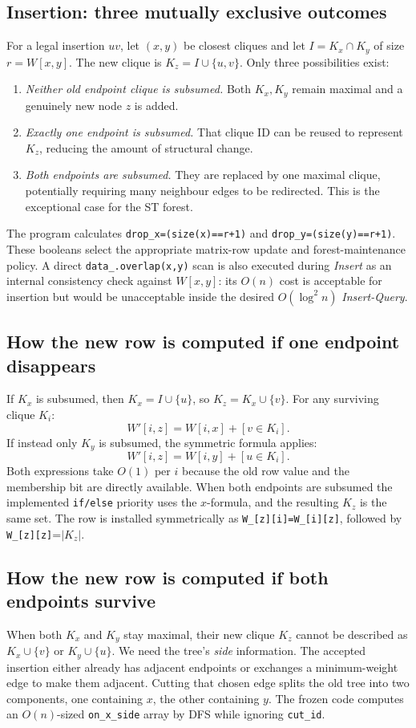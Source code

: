 \subsection{Insertion: three mutually exclusive outcomes}
For a legal insertion \(uv\), let \((x,y)\) be closest cliques and let \(I=K_x\cap K_y\) of size \(r=W[x,y]\).  The new clique is \(K_z=I\cup\{u,v\}\).  Only three possibilities exist:
\begin{enumerate}[leftmargin=*]
\item \emph{Neither old endpoint clique is subsumed.} Both \(K_x,K_y\) remain maximal and a genuinely new node \(z\) is added.
\item \emph{Exactly one endpoint is subsumed.} That clique ID can be reused to represent \(K_z\), reducing the amount of structural change.
\item \emph{Both endpoints are subsumed.} They are replaced by one maximal clique, potentially requiring many neighbour edges to be redirected.  This is the exceptional case for the ST forest.
\end{enumerate}
The program calculates \texttt{drop\_x=(size(x)==r+1)} and \texttt{drop\_y=(size(y)==r+1)}.  These booleans select the appropriate matrix-row update and forest-maintenance policy.  A direct \texttt{data\_.overlap(x,y)} scan is also executed during \emph{Insert} as an internal consistency check against \(W[x,y]\): its \(O(n)\) cost is acceptable for insertion but would be unacceptable inside the desired \(O(\log^2 n)\) \emph{Insert-Query}.

\subsection{How the new row is computed if one endpoint disappears}
If \(K_x\) is subsumed, then \(K_x=I\cup\{u\}\), so \(K_z=K_x\cup\{v\}\).  For any surviving clique \(K_i\):
\[
W'[i,z]=W[i,x]+[v\in K_i].
\]
If instead only \(K_y\) is subsumed, the symmetric formula applies:
\[
W'[i,z]=W[i,y]+[u\in K_i].
\]
Both expressions take \(O(1)\) per \(i\) because the old row value and the membership bit are directly available.  When both endpoints are subsumed the implemented \texttt{if/else} priority uses the \(x\)-formula, and the resulting \(K_z\) is the same set.  The row is installed symmetrically as \texttt{W\_[z][i]=W\_[i][z]}, followed by \texttt{W\_[z][z]}=\(\lvert K_z\rvert\).

\subsection{How the new row is computed if both endpoints survive}
When both \(K_x\) and \(K_y\) stay maximal, their new clique \(K_z\) cannot be described as \(K_x\cup\{v\}\) or \(K_y\cup\{u\}\).  We need the tree's \emph{side} information.  The accepted insertion either already has adjacent endpoints or exchanges a minimum-weight edge to make them adjacent.  Cutting that chosen edge splits the old tree into two components, one containing \(x\), the other containing \(y\).  The frozen code computes an \(O(n)\)-sized \texttt{on\_x\_side} array by DFS while ignoring \texttt{cut\_id}.

